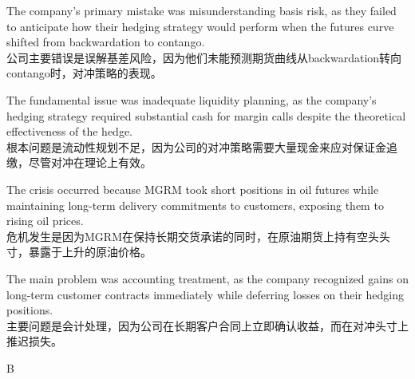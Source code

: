 \documentclass{article}
\begin{document}
    \begin{choices}
        \item The company's primary mistake was misunderstanding basis risk, as they failed to anticipate how their hedging strategy would perform when the futures curve shifted from backwardation to contango. \\
        公司主要错误是误解基差风险，因为他们未能预测期货曲线从backwardation转向contango时，对冲策略的表现。
    
        \item The fundamental issue was inadequate liquidity planning, as the company's hedging strategy required substantial cash for margin calls despite the theoretical effectiveness of the hedge. \\
        根本问题是流动性规划不足，因为公司的对冲策略需要大量现金来应对保证金追缴，尽管对冲在理论上有效。
    
        \item The crisis occurred because MGRM took short positions in oil futures while maintaining long-term delivery commitments to customers, exposing them to rising oil prices. \\
        危机发生是因为MGRM在保持长期交货承诺的同时，在原油期货上持有空头头寸，暴露于上升的原油价格。
    
        \item The main problem was accounting treatment, as the company recognized gains on long-term customer contracts immediately while deferring losses on their hedging positions. \\
        主要问题是会计处理，因为公司在长期客户合同上立即确认收益，而在对冲头寸上推迟损失。
    \end{choices}
    
    \begin{correctanswer}
        B
    \end{correctanswer}
    
\end{document}
